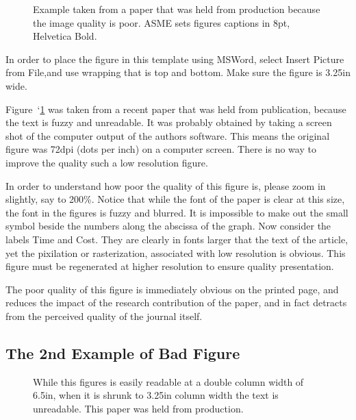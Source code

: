\documentclass[twocolumn,10pt]{asme2ej}
\begin{document}
\begin{figure} 
\centerline{}
\caption{Example taken from a paper that was held from production because the image quality is poor.  ASME sets figures captions in 8pt, Helvetica Bold.}
\label{fig_example1.ps}
\end{figure}

In order to place the figure in this template using MSWord, select Insert Picture from File,and use wrapping that is  top and bottom.  Make sure the figure is 3.25in wide.
 
Figure~`\ref{fig_example1.ps}
was taken from a recent paper that was held from publication, because the text is fuzzy and unreadable.  It was probably obtained by taking a screen shot of the computer output of the authors software.  This means the original figure was 72dpi (dots per inch) on a computer screen.  There is no way to improve the quality such a low resolution figure.
 
In order to understand how poor the quality of this figure is, please zoom in slightly, say to 200\%.  Notice that while the font of the paper is clear at this size, the font in the figures is fuzzy and blurred.  It is impossible to make out the small symbol beside the numbers along the abscissa of the graph.  Now consider the labels Time and Cost.  They are clearly in fonts larger that the text of the article, yet the pixilation or rasterization, associated with low resolution is obvious. This figure must be regenerated at higher resolution to ensure quality presentation.

The poor quality of this figure is immediately obvious on the printed page, and reduces the impact of the research contribution of the paper, and in fact detracts from the perceived quality of the journal itself.



\subsection{The 2nd Example of Bad Figure}

\begin{figure} 
\centerline{}
\caption{While this figures is easily readable at a double column width of 6.5in, when it is shrunk to 3.25in column width the text is unreadable.   This paper was held from production.}
\label{fig_example2.ps}
\end{figure}
\end{document}
